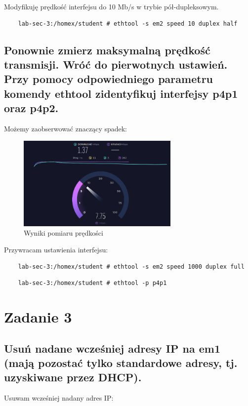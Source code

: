 \documentclass[polish, a4paper]{article}
\begin{document}
Modyfikuję prędkość interfejsu do 10 Mb/s w trybie pół-dupleksowym.
\begin{verbatim}
    lab-sec-3:/homex/student # ethtool -s em2 speed 10 duplex half
\end{verbatim}

\subsection{Ponownie zmierz maksymalną prędkość transmisji. Wróć do pierwotnych ustawień. Przy pomocy odpowiedniego parametru komendy ethtool
zidentyfikuj interfejsy p4p1 oraz p4p2.}

Możemy zaobserwować znaczący spadek:

\begin{figure}[H]
\centering
\includegraphics[width=0.7\textwidth]{speedtest2.png}
\caption{Wyniki pomiaru prędkości}
\end{figure}

Przywracam ustawienia interfejsu:

\begin{verbatim}
    lab-sec-3:/homex/student # ethtool -s em2 speed 1000 duplex full
\end{verbatim}

\begin{verbatim}
    lab-sec-3:/homex/student # ethtool -p p4p1
\end{verbatim}

\section{Zadanie 3}
\subsection{Usuń nadane wcześniej adresy IP na em1 (mają pozostać tylko
standardowe adresy, tj. uzyskiwane przez DHCP).}

Usuwam wcześniej nadany adres IP:
\end{document}
